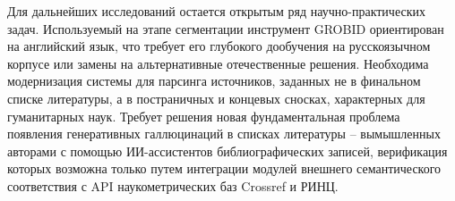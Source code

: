 Для дальнейших исследований остается открытым ряд научно-практических задач. Используемый на этапе сегментации инструмент GROBID ориентирован на английский язык, что требует его глубокого дообучения на русскоязычном корпусе или замены на альтернативные отечественные решения. Необходима модернизация системы для парсинга источников, заданных не в финальном списке литературы, а в постраничных и концевых сносках, характерных для гуманитарных наук. Требует решения новая фундаментальная проблема появления \guillemotleft генеративных галлюцинаций\guillemotright{} в списках литературы -- вымышленных авторами с помощью ИИ-ассистентов библиографических записей, верификация которых возможна только путем интеграции модулей внешнего семантического соответствия с API наукометрических баз Crossref и РИНЦ.